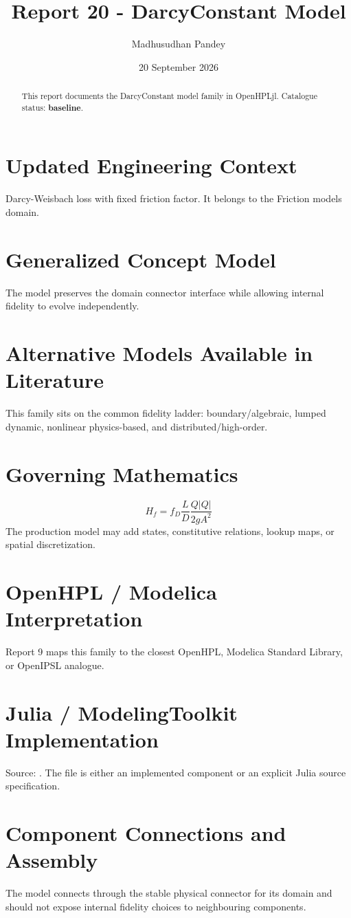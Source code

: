\documentclass[10pt,a4paper]{article}
\title{Report 20 - DarcyConstant Model}
\author{Madhusudhan Pandey}
\date{20 September 2026}
\begin{document}
\maketitle
\begin{abstract}This report documents the DarcyConstant model family in OpenHPLjl. Catalogue status: \textbf{baseline}.\end{abstract}
\section{Updated Engineering Context}Darcy-Weisbach loss with fixed friction factor. It belongs to the Friction models domain.
\section{Generalized Concept Model}The model preserves the domain connector interface while allowing internal fidelity to evolve independently.
\section{Alternative Models Available in Literature}This family sits on the common fidelity ladder: boundary/algebraic, lumped dynamic, nonlinear physics-based, and distributed/high-order.
\section{Governing Mathematics}\[H_f=f_D\frac{L}{D}\frac{Q|Q|}{2gA^2}\]The production model may add states, constitutive relations, lookup maps, or spatial discretization.
\section{OpenHPL / Modelica Interpretation}Report 9 maps this family to the closest OpenHPL, Modelica Standard Library, or OpenIPSL analogue.
\section{Julia / ModelingToolkit Implementation}Source: \texttt{}. The file is either an implemented component or an explicit Julia source specification.
\section{Component Connections and Assembly}The model connects through the stable physical connector for its domain and should not expose internal fidelity choices to neighbouring components.
\end{document}
